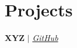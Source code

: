 
\section{Projects}
    
    \itemizeCVBegin
      
        {\textbf{XYZ} $|$ \emph{\href{https://github.com/beyefendi/<>}{\color{blue}GitHub}}}{}
        \resumeItemListStart
        \resumeItemListEnd

    \itemizeCVEnd